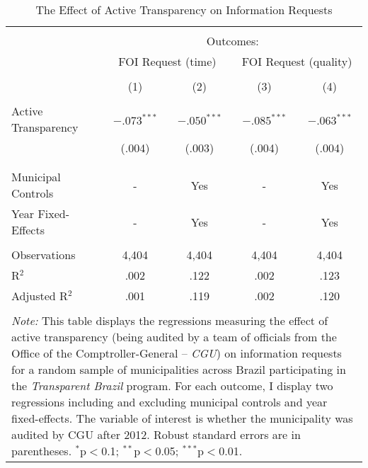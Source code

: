 
\begin{table}[!htbp] \centering
  \caption{The Effect of Active Transparency on Information Requests}
  \label{tab:transparency2}
\scriptsize
\begin{tabular}{@{\extracolsep{5pt}}lcccc}
\\[-1.8ex]\hline
\hline \\[-1.8ex]
& \multicolumn{4}{c}{Outcomes:} \T \B \\
\cline{2-5}
 & \multicolumn{2}{c}{FOI Request (time)} & \multicolumn{2}{c}{FOI Request (quality)} \T \B \\
\\[-1.8ex] & \multicolumn{1}{c}{(1)} & \multicolumn{1}{c}{(2)} & \multicolumn{1}{c}{(3)} & \multicolumn{1}{c}{(4)} \B \\
\hline \\[-1.8ex]
 Active Transparency & $-.073^{***}$ & $-.050^{***}$ & $-.085^{***}$ & $-.063^{***}$ \\
                     & (.004) & (.003) & (.004) & (.004) \\
                     & & & & \\
\hline \\[-1.8ex]
Municipal Controls & \multicolumn{1}{c}{-} & \multicolumn{1}{c}{Yes} & \multicolumn{1}{c}{-} & \multicolumn{1}{c}{Yes} \\
Year Fixed-Effects & \multicolumn{1}{c}{-} & \multicolumn{1}{c}{Yes} & \multicolumn{1}{c}{-} & \multicolumn{1}{c}{Yes} \\
\hline \\[-1.8ex]
Observations & \multicolumn{1}{c}{4,404} & \multicolumn{1}{c}{4,404} & \multicolumn{1}{c}{4,404} & \multicolumn{1}{c}{4,404} \\
R$^{2}$ & \multicolumn{1}{c}{.002} & \multicolumn{1}{c}{.122} & \multicolumn{1}{c}{.002} & \multicolumn{1}{c}{.123} \\
Adjusted R$^{2}$ & \multicolumn{1}{c}{.001} & \multicolumn{1}{c}{.119} & \multicolumn{1}{c}{.002} & \multicolumn{1}{c}{.120} \\
\hline
\hline \\[-1.8ex]
\multicolumn{5}{p{.6\textwidth}}{\emph{Note:} This table displays the regressions measuring the effect of active transparency (being audited by a team of officials from the Office of the Comptroller-General -- \emph{CGU}) on information requests for a random sample of municipalities across Brazil participating in the \emph{Transparent Brazil} program. For each outcome, I display two regressions including and excluding municipal controls and year fixed-effects. The variable of interest is whether the municipality was audited by CGU after 2012. Robust standard errors are in parentheses. $^{*}$p$<$0.1; $^{**}$p$<$0.05; $^{***}$p$<$0.01.}\\
\end{tabular}
\end{table}
